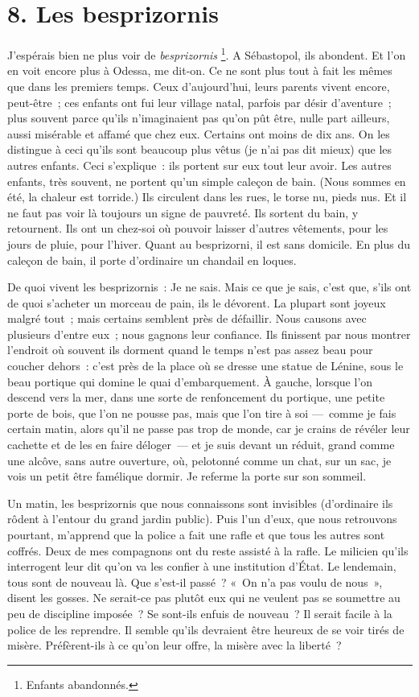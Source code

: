 \documentclass[twoside]{book} %
\begin{document}
\section[{8. Les besprizornis}]{8. Les besprizornis}

\noindent J’espérais bien ne plus voir de \emph{besprizornis} \footnote{Enfants abandonnés.}. A Sébastopol, ils abondent. Et l’on en voit encore plus à Odessa, me dit-on. Ce ne sont plus tout à fait les mêmes que dans les premiers temps. Ceux d’aujourd’hui, leurs parents vivent encore, peut-être ; ces enfants ont fui leur village natal, parfois par désir d’aventure ; plus souvent parce qu’ils n’imaginaient pas qu’on pût être, nulle part ailleurs, aussi misérable et affamé que chez eux. Certains ont moins de dix ans. On les distingue à ceci qu’ils sont beaucoup plus vêtus (je n’ai pas dit mieux) que les autres enfants. Ceci s’explique : ils portent sur eux tout leur avoir. Les autres enfants, très souvent, ne portent qu’un simple caleçon de bain. (Nous sommes en été, la chaleur est torride.) Ils circulent dans les rues, le torse nu, pieds nus. Et il ne faut pas voir là toujours un signe de pauvreté. Ils sortent du bain, y retournent. Ils ont un chez-soi où pouvoir laisser d’autres vêtements, pour les jours de pluie, pour l’hiver. Quant au besprizorni, il est sans domicile. En plus du caleçon de bain, il porte d’ordinaire un chandail en loques.\par
De quoi vivent les besprizornis : Je ne sais. Mais ce que je sais, c’est que, s’ils ont de quoi s’acheter un morceau de pain, ils le dévorent. La plupart sont joyeux malgré tout ; mais certains semblent près de défaillir. Nous causons avec plusieurs d’entre eux ; nous gagnons leur confiance. Ils finissent par nous montrer l’endroit où souvent ils dorment quand le temps n’est pas assez beau pour coucher dehors : c’est près de la place où se dresse une statue de Lénine, sous le beau portique qui domine le quai d’embarquement. À gauche, lorsque l’on descend vers la mer, dans une sorte de renfoncement du portique, une petite porte de bois, que l’on ne pousse pas, mais que l’on tire à soi — comme je fais certain matin, alors qu’il ne passe pas trop de monde, car je crains de révéler leur cachette et de les en faire déloger — et je suis devant un réduit, grand comme une alcôve, sans autre ouverture, où, pelotonné comme un chat, sur un sac, je vois un petit être famélique dormir. Je referme la porte sur son sommeil.\par
Un matin, les besprizornis que nous connaissons sont invisibles (d’ordinaire ils rôdent à l’entour du grand jardin public). Puis l’un d’eux, que nous retrouvons pourtant, m’apprend que la police a fait une rafle et que tous les autres sont coffrés. Deux de mes compagnons ont du reste assisté à la rafle. Le milicien qu’ils interrogent leur dit qu’on va les confier à une institution d’État. Le lendemain, tous sont de nouveau là. Que s’est-il passé ? « On n’a pas voulu de nous », disent les gosses. Ne serait-ce pas plutôt eux qui ne veulent pas se soumettre au peu de discipline imposée ? Se sont-ils enfuis de nouveau ? Il serait facile à la police de les reprendre. Il semble qu’ils devraient être heureux de se voir tirés de misère. Préfèrent-ils à ce qu’on leur offre, la misère avec la liberté ?\par
\end{document}
